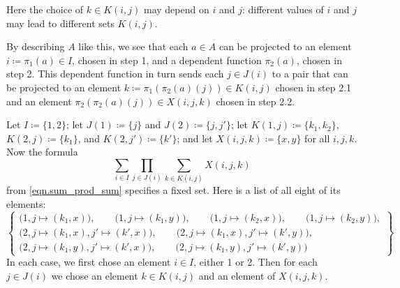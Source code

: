 \documentclass[Book-Poly]{subfiles}
\begin{document}
Here the choice of $k\in K(i,j)$ may depend on $i$ and $j$: different values of $i$ and $j$ may lead to different sets $K(i,j)$.

By describing $A$ like this, we see that each $a \in A$ can be projected to an element $i\coloneqq\pi_1(a) \in I$, chosen in step 1, and a dependent function $\pi_2(a)$, chosen in step 2.
This dependent function in turn sends each $j \in J(i)$ to a pair that can be projected to an element $k\coloneqq\pi_1(\pi_2(a)(j)) \in K(i, j)$ chosen in step 2.1 and an element $\pi_2(\pi_2(a)(j)) \in X(i,j,k)$ chosen in step 2.2.

\begin{example}%
    \label{ex.notation_sum_prod}

    Let $I\coloneqq\{1,2\}$; let $J(1)\coloneqq\{j\}$ and $J(2)\coloneqq\{j,j'\}$; let $K(1,j)\coloneqq\{k_1,k_2\}$, $K(2,j)\coloneqq\{k_1\}$, and $K(2,j')\coloneqq\{k'\}$; and let $X(i,j,k)\coloneqq\{x,y\}$ for all $i,j,k$. Now the formula
    \[\sum_{i\in I}\prod_{j\in J(i)}\sum_{k\in K(i,j)}X(i,j,k)\]
    from \eqref{eqn.sum_prod_sum} specifies a fixed set. Here is a list of all eight of its elements:
    \[
    \left\{
    \begin{gathered}
        \big(1, j\mapsto(k_1,x)\big),\qquad
        \big(1, j\mapsto(k_1,y)\big),\qquad
        \big(1, j\mapsto(k_2,x)\big),\qquad
        \big(1, j\mapsto(k_2,y)\big),\\
        \big(2, j\mapsto(k_1,x), j'\mapsto(k',x)\big),\qquad
        \big(2, j\mapsto(k_1,x), j'\mapsto(k',y)\big),\\
        \big(2, j\mapsto(k_1,y), j'\mapsto(k',x)\big),\qquad
        \big(2, j\mapsto(k_1,y), j'\mapsto(k',y)\big)
    \end{gathered}
    \right\}
    \]
    In each case, we first chose an element $i\in I$, either 1 or 2. Then for each $j\in J(i)$ we chose an element $k\in K(i,j)$ and an element of $X(i,j,k)$.
\end{example}
\end{document}
